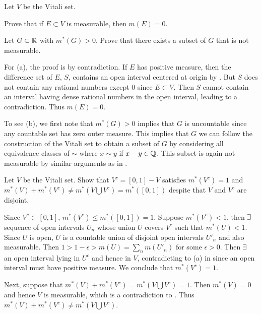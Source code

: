 \begin{exercise}
    Let $V$ be the Vitali set. 
    \begin{thmenum}
        \item Prove that if $E\subset V$ is measurable, then 
        $m(E) = 0$. 
        \item Let $G\subset\mathbb{R}$ with $m^*(G)>0$. Prove that there 
        exists a subset of $G$ that is not measurable. 
    \end{thmenum}
\end{exercise}
\begin{pf}
    For (a), the proof is by contradiction. If $E$ has positive 
    measure, then the difference set of $E$, $S$, contains 
    an open interval centered at origin by . But 
    $S$ does not contain any rational numbers except $0$ since 
    $E\subset V$. Then $S$ cannot contain an interval having 
    dense rational numbers in the open interval, leading to a  
    contradiction. Thus $m(E) = 0$.

    To see (b), we first note that $m^*(G)>0$ implies that 
    $G$ is uncountable since any countable set has zero outer
    measure. This implies that $G$ we can follow the 
    construction of the Vitali set to obtain a subset of $G$ 
    by considering all equivalence classes of $\sim$ where 
    $x\sim y$ if $x-y\in\mathbb{Q}$. This subset is again not 
    measurable by similar arguments as in .
\end{pf}

\begin{exercise}
    Let $V$ be the Vitali set. Show that $V^c = [0,1] - V$ 
    satisfies $m^*(V^c) = 1$ and $m^*(V) + m^*(V^c)\neq 
    m^*(V\bigcup V^c) = m^*([0,1])$ despite that $V$ and 
    $V^c$ are disjoint.
\end{exercise}
\begin{pf}
    Since $V^c\subset [0,1]$, $m^*(V^c)\leq m^*([0,1]) = 1$. 
    Suppose $m^*(V^c)<1$, then $\exists\:$ sequence of open 
    intervals $U_n$ whose union $U$ covers $V^c$ such that 
    $m^*(U) < 1$. Since $U$ is open, $U$ is a countable union 
    of disjoint open intervals $U'_n$ and also measurable. Then 
    $1>1-\epsilon>m(U) = \sum_n m(U'_n)$ for some $\epsilon>0$. 
    Then $\exists\:$ an open interval lying in $U^c$ and hence in 
    $V$, contradicting to (a) in  since an open 
    interval must have positive measure. We conclude that 
    $m^*(V^c) = 1$.

    Next, suppose that $m^*(V)+m^*(V^c)=m^*(V\bigcup V^c)=1$. 
    Then $m^*(V)=0$ and hence $V$ is measurable, which is a 
    contradiction to . Thus $m^*(V) + m^*(V^c)
    \neq m^*(V\bigcup V^c)$.
\end{pf}

